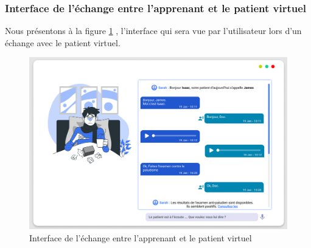 \subsubsection{Interface de l'échange entre l'apprenant et le patient virtuel}
Nous présentons à la figure \ref{fig:echange} , l'interface qui sera vue par l'utilisateur lors d'un échange avec le patient virtuel.
\begin{figure}[H]
    \centering
    \includegraphics[width=\textwidth]{figures/patient-apprenant.png}
        \captionsetup{justification=centering}
    \caption{Interface de l'échange entre l'apprenant et le patient virtuel}
    \label{fig:echange}
\end{figure}


